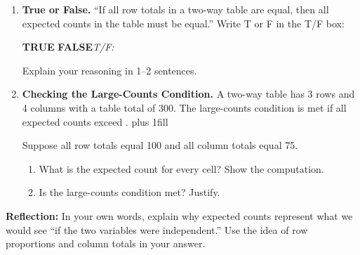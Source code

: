 \documentclass[10pt]{article}
\begin{document}
\begin{enumerate}
  \item \textbf{True or False.} ``If all row totals in a two-way table are equal, then all
        expected counts in the table must be equal.'' Write T or F in the T/F box:

        \vspace{0.1in}
        \rule{0pt}{0.45in}\textbf{TRUE} \hspace{2cm} \textbf{FALSE}\hspace{0.6in}\textit{T/F:}~\smash{\gradedblank[id=hw2a, type=choice, points=1, answer=F]{0.4in}{0.2in}}

        \vspace{0.1in}
        Explain your reasoning in 1--2 sentences.


  \item \textbf{Checking the Large-Counts Condition.} A two-way table has 3 rows and
        4 columns with a table total of 300. The large-counts condition is met if all
        expected counts exceed \hphantom{\blank{1cm}}.\hskip 0pt plus 1fill\smash{\gradedblank[id=hw3, type=short, points=1, answer=5, check=numeric, tolerance=0]{1cm}{0.2in}}

        \vspace{0.1in}
        Suppose all row totals equal 100 and all column totals equal 75.

        \begin{enumerate}[label=\alph*.]
            \item What is the expected count for every cell? Show the computation.


            \boxguard[16]
            \item Is the large-counts condition met? Justify.

        \end{enumerate}

\end{enumerate}

\begin{reflectionbox}
\textbf{Reflection:} In your own words, explain why expected counts represent what we
would see ``if the two variables were independent.'' Use the idea of row proportions
and column totals in your answer.

\end{reflectionbox}
\end{document}
